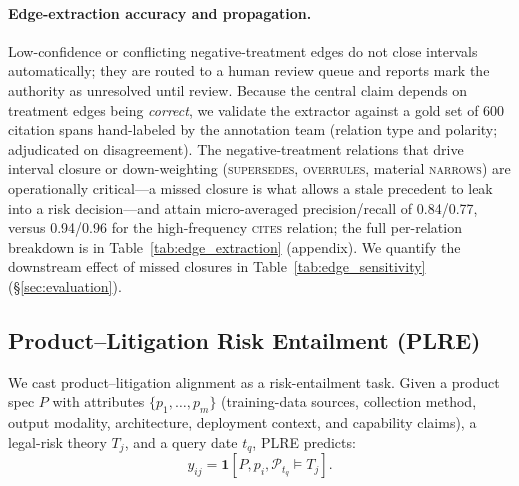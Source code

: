 \paragraph{Edge-extraction accuracy and propagation.} Low-confidence or conflicting negative-treatment edges do not close intervals automatically; they are routed to a human review queue and reports mark the authority as unresolved until review. Because the central claim depends on treatment edges being \emph{correct}, we validate the extractor against a gold set of 600 citation spans hand-labeled by the annotation team (relation type and polarity; adjudicated on disagreement). The negative-treatment relations that drive interval closure or down-weighting (\textsc{supersedes}, \textsc{overrules}, material \textsc{narrows}) are operationally critical---a missed closure is what allows a stale precedent to leak into a risk decision---and attain micro-averaged precision/recall of 0.84/0.77, versus 0.94/0.96 for the high-frequency \textsc{cites} relation; the full per-relation breakdown is in Table~\ref{tab:edge_extraction} (appendix). We quantify the downstream effect of missed closures in Table~\ref{tab:edge_sensitivity} (\S\ref{sec:evaluation}).

\subsection{Product--Litigation Risk Entailment (PLRE)}
\label{sec:plre}

We cast product--litigation alignment as a risk-entailment task. Given a product spec $P$ with attributes $\{p_1,\dots,p_m\}$ (training-data sources, collection method, output modality, architecture, deployment context, and capability claims), a legal-risk theory $T_j$, and a query date $t_q$, PLRE predicts:
\begin{equation}
  y_{ij}=\mathbf{1}[P,p_i,\mathcal{P}_{t_q} \models T_j].
\end{equation}
\begin{table}[t]
\centering
\caption{Schematic PLRE instances (illustrative; not drawn from VIGIL-Dataset). The same attribute--theory pair can be positive or negative depending on whether its supporting authority is still operative at $t_q$.}
\label{tab:plre_example}
\small
\setlength{\tabcolsep}{3pt}
\end{table}

